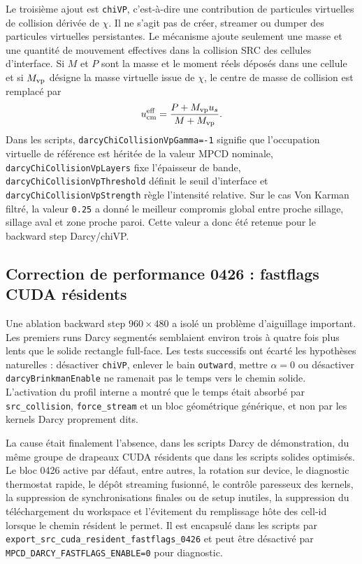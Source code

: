 \documentclass[11pt,a4paper]{article}
\begin{document}
Le troisième ajout est \texttt{chiVP}, c'est-à-dire une contribution de particules virtuelles de collision dérivée de $\chi$. Il ne s'agit pas de créer, streamer ou dumper des particules virtuelles persistantes. Le mécanisme ajoute seulement une masse et une quantité de mouvement effectives dans la collision SRC des cellules d'interface. Si $M$ et $P$ sont la masse et le moment réels déposés dans une cellule et si $M_{\rm vp}$ désigne la masse virtuelle issue de $\chi$, le centre de masse de collision est remplacé par
\begin{equation}
  u_{\rm cm}^{\rm eff} = \frac{P + M_{\rm vp} u_s}{M+M_{\rm vp}}.
\end{equation}
Dans les scripts, \texttt{darcyChiCollisionVpGamma=-1} signifie que l'occupation virtuelle de référence est héritée de la valeur MPCD nominale, \texttt{darcyChiCollisionVpLayers} fixe l'épaisseur de bande, \texttt{darcyChiCollisionVpThreshold} définit le seuil d'interface et \texttt{darcyChiCollisionVpStrength} règle l'intensité relative. Sur le cas Von Karman filtré, la valeur \texttt{0.25} a donné le meilleur compromis global entre proche sillage, sillage aval et zone proche paroi. Cette valeur a donc été retenue pour le backward step Darcy/chiVP.

\subsection{Correction de performance 0426 : fastflags CUDA résidents}

Une ablation backward step $960\times480$ a isolé un problème d'aiguillage important. Les premiers runs Darcy segmentés semblaient environ trois à quatre fois plus lents que le solide rectangle full-face. Les tests successifs ont écarté les hypothèses naturelles : désactiver \texttt{chiVP}, enlever le bain \texttt{outward}, mettre $\alpha=0$ ou désactiver \texttt{darcyBrinkmanEnable} ne ramenait pas le temps vers le chemin solide. L'activation du profil interne a montré que le temps était absorbé par \texttt{src\_collision}, \texttt{force\_stream} et un bloc géométrique générique, et non par les kernels Darcy proprement dits.

La cause était finalement l'absence, dans les scripts Darcy de démonstration, du même groupe de drapeaux CUDA résidents que dans les scripts solides optimisés. Le bloc 0426 active par défaut, entre autres, la rotation sur device, le diagnostic thermostat rapide, le dépôt streaming fusionné, le contrôle paresseux des kernels, la suppression de synchronisations finales ou de setup inutiles, la suppression du téléchargement du workspace et l'évitement du remplissage hôte des cell-id lorsque le chemin résident le permet. Il est encapsulé dans les scripts par \texttt{export\_src\_cuda\_resident\_fastflags\_0426} et peut être désactivé par \texttt{MPCD\_DARCY\_FASTFLAGS\_ENABLE=0} pour diagnostic.
\end{document}
